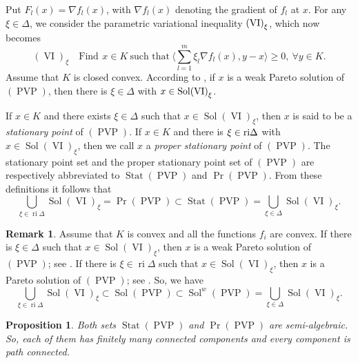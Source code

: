 \documentclass[]{interact}
\theoremstyle{plain}%
\newtheorem{proposition}{Proposition}[section]
\theoremstyle{definition}
\newtheorem{remark}{Remark}[section]
\DeclareMathOperator{\Sol}{Sol}
\DeclareMathOperator{\PVP}{PVP}
\DeclareMathOperator{\VI}{VI}
\DeclareMathOperator{\Stat}{Stat}
\DeclareMathOperator{\ri}{ri}
\begin{document}
Put $F_l(x)=\nabla f_l(x)$, with $\nabla f_l(x)$ denoting the gradient of $f_l$ at $x$. For any $\xi\in\Delta$, we consider the parametric variational inequality ${\rm (VI)}_\xi$, which now becomes
$$(\VI)_\xi \quad {\text{Find}}\ \, x\in K \  \text{such that}\  \Big\langle\sum_{l=1}^m\xi_l\nabla f_l( x),y- x\Big\rangle\geq 0,\  \forall y\in K.$$
Assume that $K$ is closed convex. According to \cite[Theorem 3.1(i)]{LKLY98}, if $x$ is a weak Pareto solution of $(\PVP)$, then there is $\xi\in\Delta$ with $x\in {\rm Sol(VI)}_\xi$. 

If $x\in K$ and there exists $\xi\in\Delta$ such that $x\in {\Sol(\VI)}_\xi$, then $x$ is said to be a {\it stationary point} of $(\PVP)$. If $x\in K$ and there is $\xi\in{\rm ri}\Delta$ with $x\in {\Sol(\VI)}_\xi$, then we call $x$ a {\it proper stationary point} of $(\PVP)$. The stationary point set and the proper stationary point set of $(\PVP)$ are respectively abbreviated to $\Stat(\PVP)$ and $\Pr(\PVP)$. From these definitions it follows that
\begin{equation}\label{Pr_stat}
\bigcup_{\xi\in {\ri}\Delta}{\Sol(\VI)}_\xi={\Pr(\PVP)}\subset {\Stat(\PVP)}=\bigcup_{\xi\in\Delta}\Sol(\VI)_\xi.
\end{equation}

\begin{remark}%
	Assume that $K$ is convex and all the functions $f_i$ are convex. If there is $\xi\in\Delta$ such that $x\in {\Sol(\VI)}_\xi$, then $x$ is a weak Pareto solution of $(\PVP)$; see \cite[Theorem 3.1(ii)]{LKLY98}. If there is $\xi\in\ri\Delta$ such that $x\in {\Sol(\VI)}_\xi$, then $x$ is a Pareto solution of $(\PVP)$; see \cite[Theorem 3.1(iii)]{LKLY98}. So, we have
	\begin{equation}\label{relation1}
	\bigcup_{\xi\in {\ri}\Delta}{\Sol(\VI)}_\xi\subset{\Sol(\PVP)}\subset \Sol^w(\PVP)=\bigcup_{\xi\in\Delta}{\Sol(\VI)}_\xi.
	\end{equation}
\end{remark}

\begin{proposition}\label{Stat} 
	Both sets $\Stat(\PVP)$ and $\Pr(\PVP)$  are semi-algebraic. So, each of them has finitely many connected components and every component is path connected.
\end{proposition}
\end{document}
